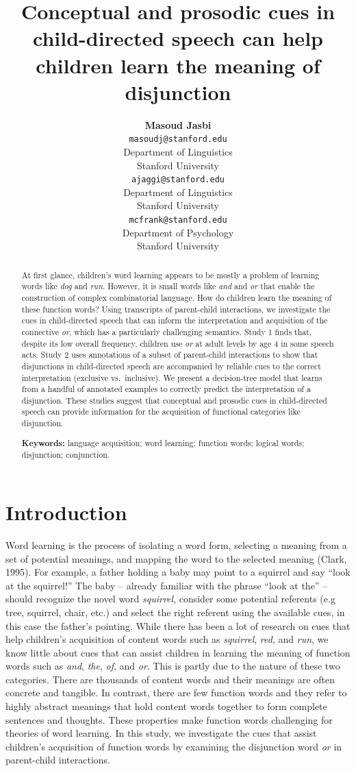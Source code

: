 \documentclass[10pt, letterpaper]{article}
\title{Conceptual and prosodic cues in child-directed speech can help children
learn the meaning of disjunction}
\author{{\large \bf Masoud Jasbi} \\ \texttt{masoudj@stanford.edu} \\ Department of Linguistics \\ Stanford University \And {\large \bf Akshay Jaggi} \\ \texttt{ajaggi@stanford.edu} \\ Department of Linguistics \\ Stanford University \And {\large \bf Michael C. Frank} \\ \texttt{mcfrank@stanford.edu} \\ Department of Psychology \\ Stanford University }
\begin{document}
\maketitle

\begin{abstract}
At first glance, children's word learning appears to be mostly a problem
of learning words like \emph{dog} and \emph{run}. However, it is small
words like \emph{and} and \emph{or} that enable the construction of
complex combinatorial language. How do children learn the meaning of
these function words? Using transcripts of parent-child interactions, we
investigate the cues in child-directed speech that can inform the
interpretation and acquisition of the connective \emph{or}, which has a
particularly challenging semantics. Study 1 finds that, despite its low
overall frequency, children use \emph{or} at adult levels by age 4 in
some speech acts. Study 2 uses annotations of a subset of parent-child
interactions to show that disjunctions in child-directed speech are
accompanied by reliable cues to the correct interpretation (exclusive
vs.~inclusive). We present a decision-tree model that learns from a
handful of annotated examples to correctly predict the interpretation of
a disjunction. These studies suggest that conceptual and prosodic cues
in child-directed speech can provide information for the acquisition of
functional categories like disjunction.

\textbf{Keywords:}
language acquisition; word learning; function words; logical words;
disjunction; conjunction.
\end{abstract}

\section{Introduction}\label{introduction}

Word learning is the process of isolating a word form, selecting a
meaning from a set of potential meanings, and mapping the word to the
selected meaning (Clark, 1995). For example, a father holding a baby may
point to a squirrel and say ``look at the squirrel!'' The baby --
already familiar with the phrase ``look at the'' -- should recognize the
novel word \emph{squirrel}, consider some potential referents (e.g tree,
squirrel, chair, etc.) and select the right referent using the available
cues, in this case the father's pointing. While there has been a lot of
research on cues that help children's acquisition of content words such
as \emph{squirrel}, \emph{red}, and \emph{run}, we know little about
cues that can assist children in learning the meaning of function words
such as \emph{and}, \emph{the}, \emph{of}, and \emph{or}. This is partly
due to the nature of these two categories. There are thousands of
content words and their meanings are often concrete and tangible. In
contrast, there are few function words and they refer to highly abstract
meanings that hold content words together to form complete sentences and
thoughts. These properties make function words challenging for theories
of word learning. In this study, we investigate the cues that assist
children's acquisition of function words by examining the disjunction
word \emph{or} in parent-child interactions.
\end{document}
